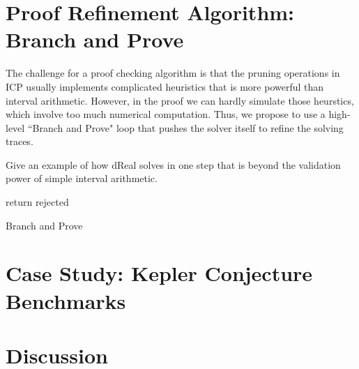 \documentclass[envcountsect]{llncs}
\begin{document}
\section{Proof Refinement Algorithm: Branch and Prove}

The challenge for a proof checking algorithm is that the pruning operations in
ICP usually implements complicated heuristics that is more powerful than
interval arithmetic. However, in the proof we can hardly simulate those
heurstics, which involve too much numerical computation. Thus, we propose to use
a high-level ``Branch and Prove" loop that pushes the solver itself to refine
the solving traces. 

\begin{example}
Give an example of how dReal solves in one step that is beyond the validation
power of simple interval arithmetic. 
\end{example}

\begin{algorithm}\label{algo1}
\BlankLine
{}
return {\sf rejected}\;
\caption{Branch and Prove}
\end{algorithm}



\section{Case Study: Kepler Conjecture Benchmarks}

\section{Discussion}



\end{document}
